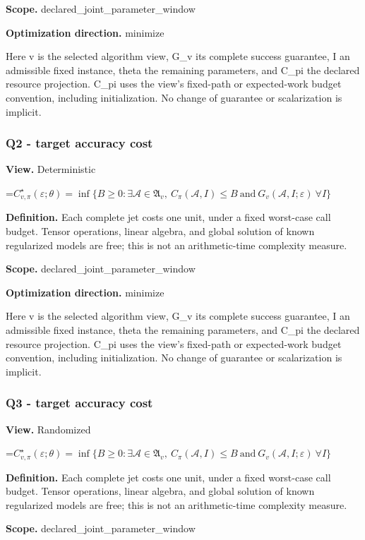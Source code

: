 \documentclass[10pt,a4paper]{article}
\newcommand{\AtlasMath}[1]{\par\begingroup\centering\setbox0=\hbox{$\displaystyle #1$}\ifdim\wd0>1.4\linewidth\typeout{ATLAS WIDE FORMULA: \the\wd0}\fi\ifdim\wd0>\linewidth\resizebox{\linewidth}{!}{\box0}\else\box0\fi\par\endgroup}
\begin{document}
\textbf{Scope.} declared\_joint\_parameter\_window

\textbf{Optimization direction.} minimize

Here v is the selected algorithm view, G\_v its complete success guarantee, I an admissible fixed instance, theta the remaining parameters, and C\_pi the declared resource projection. C\_pi uses the view's fixed-path or expected-work budget convention, including initialization. No change of guarantee or scalarization is implicit.

\subsubsection{Q2 - target accuracy cost}
\textbf{View.} Deterministic

\AtlasMath{C^\star_{v,\pi}(\varepsilon;\theta)=\inf\{B\ge0:\exists\mathcal A\in\mathfrak A_v,\ C_\pi(\mathcal A,I)\le B\ \text{and}\ G_v(\mathcal A,I;\varepsilon)\ \forall I\}}
\textbf{Definition.} Each complete jet costs one unit, under a fixed worst-case call budget. Tensor operations, linear algebra, and global solution of known regularized models are free; this is not an arithmetic-time complexity measure.

\textbf{Scope.} declared\_joint\_parameter\_window

\textbf{Optimization direction.} minimize

Here v is the selected algorithm view, G\_v its complete success guarantee, I an admissible fixed instance, theta the remaining parameters, and C\_pi the declared resource projection. C\_pi uses the view's fixed-path or expected-work budget convention, including initialization. No change of guarantee or scalarization is implicit.

\subsubsection{Q3 - target accuracy cost}
\textbf{View.} Randomized

\AtlasMath{C^\star_{v,\pi}(\varepsilon;\theta)=\inf\{B\ge0:\exists\mathcal A\in\mathfrak A_v,\ C_\pi(\mathcal A,I)\le B\ \text{and}\ G_v(\mathcal A,I;\varepsilon)\ \forall I\}}
\textbf{Definition.} Each complete jet costs one unit, under a fixed worst-case call budget. Tensor operations, linear algebra, and global solution of known regularized models are free; this is not an arithmetic-time complexity measure.

\textbf{Scope.} declared\_joint\_parameter\_window
\end{document}
